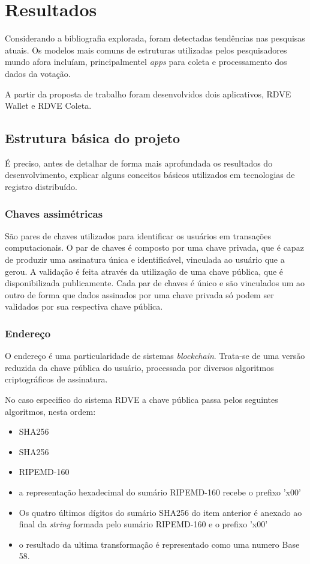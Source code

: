 \chapter{Resultados}

Considerando a bibliografia explorada, foram detectadas tendências nas pesquisas atuais. Os modelos mais comuns de estruturas utilizadas pelos pesquisadores mundo afora incluíam, principalmentel \textit{apps} para coleta e processamento dos dados da votação. 

A partir da proposta de trabalho foram desenvolvidos dois aplicativos, RDVE Wallet e RDVE Coleta. 

\section{Estrutura básica do projeto}
É preciso, antes de detalhar de forma mais aprofundada os resultados do desenvolvimento, explicar alguns conceitos básicos utilizados em tecnologias de registro distribuído. 

\subsection{Chaves assimétricas}

São pares de chaves utilizados para identificar os usuários em transações computacionais. O par de chaves é composto por uma chave privada, que é capaz de produzir uma assinatura única e identificável, vinculada ao usuário que a gerou. A validação é feita através da utilização de uma chave pública, que é disponibilizada publicamente. Cada par de chaves é único e são vinculados um ao outro de forma que dados assinados por uma chave privada só podem ser validados por sua respectiva chave pública. 

\subsection{Endereço}

O endereço é uma particularidade de sistemas \textit{blockchain}. Trata-se de uma versão reduzida da chave pública do usuário, processada por diversos algoritmos criptográficos de assinatura.

No caso especifico do sistema RDVE a chave pública passa pelos seguintes algoritmos, nesta ordem:

\begin{itemize}
	\item SHA256
	\item SHA256
	\item RIPEMD-160
	\item a representação hexadecimal do sumário RIPEMD-160 recebe o prefixo 'x00'
	\item Os quatro últimos dígitos do sumário SHA256 do item anterior é anexado ao final da \textit{string} formada pelo sumário RIPEMD-160 e o prefixo 'x00'
	\item o resultado da ultima transformação é representado como uma numero Base 58.
	
\end{itemize}


